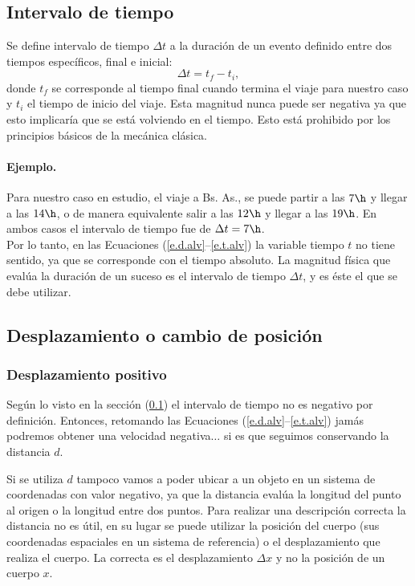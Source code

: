 \subsection{Intervalo de tiempo}
\label{c.dt}

Se define intervalo de tiempo $\Delta t$ a la duración de un evento definido
entre dos tiempos específicos, final e inicial:
\begin{equation}
  \Delta t = t_f - t_i,
  \label{e.dt}
\end{equation}
donde $t_f$ se corresponde al tiempo final cuando termina el viaje para nuestro
caso y $t_i$ el tiempo de inicio del viaje. Esta magnitud nunca puede ser
negativa ya que esto implicaría que se está volviendo en el tiempo. Esto está
prohibido por los principios básicos de la mecánica clásica. 

\paragraph{Ejemplo.} 
Para nuestro caso en estudio, el viaje a Bs. As., se puede partir a las $7\h$ y
llegar a las $14\h$, o de manera equivalente salir a las $12\h$ y llegar a las
$19\h$. En ambos casos el intervalo de tiempo fue de $\Delta t = 7\h$.
\finej \\

Por lo tanto, en las Ecuaciones (\ref{e.d.alv}--\ref{e.t.alv}) la variable
tiempo $t$ no tiene sentido, ya que se corresponde con el tiempo absoluto. La
magnitud física que evalúa la duración de un suceso es el intervalo de tiempo
$\Delta t$, y es éste el que se debe utilizar.


\subsection{Desplazamiento o cambio de posición}
\label{c.dx}

\subsubsection{Desplazamiento positivo}

Según lo visto en la sección (\ref{c.dt}) el intervalo de tiempo no es negativo
por definición. Entonces, retomando las Ecuaciones
(\ref{e.d.alv}--\ref{e.t.alv}) jamás podremos obtener una velocidad
negativa$\ldots$ si es que seguimos conservando la distancia $d$.

Si se utiliza $d$ tampoco vamos a poder ubicar a un objeto en un sistema de
coordenadas con valor negativo, ya que la distancia evalúa la longitud del punto
al origen o la longitud entre dos puntos. Para realizar una descripción correcta
la distancia no es útil, en su lugar se puede utilizar la posición del cuerpo
(sus coordenadas espaciales en un sistema de referencia) o el desplazamiento que
realiza el cuerpo. La correcta es el desplazamiento $\Delta x$ y no la posición
de un cuerpo $x$. 

